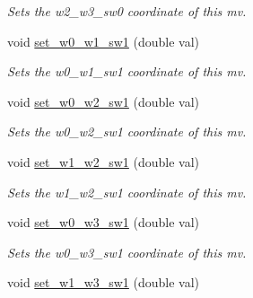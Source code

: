 \begin{DoxyCompactItemize}
\begin{DoxyCompactList}\small\item\em Sets the w2\-\_\-w3\-\_\-sw0 coordinate of this mv. \end{DoxyCompactList}\item 
\hypertarget{classe3ga_1_1mv_aa7ab6415eb4c4310f8498ad53a774565}{void \hyperlink{classe3ga_1_1mv_aa7ab6415eb4c4310f8498ad53a774565}{set\-\_\-w0\-\_\-w1\-\_\-sw1} (double val)}\label{classe3ga_1_1mv_aa7ab6415eb4c4310f8498ad53a774565}

\begin{DoxyCompactList}\small\item\em Sets the w0\-\_\-w1\-\_\-sw1 coordinate of this mv. \end{DoxyCompactList}\item 
\hypertarget{classe3ga_1_1mv_a5e80118c8595b7cce491218e24780dc8}{void \hyperlink{classe3ga_1_1mv_a5e80118c8595b7cce491218e24780dc8}{set\-\_\-w0\-\_\-w2\-\_\-sw1} (double val)}\label{classe3ga_1_1mv_a5e80118c8595b7cce491218e24780dc8}

\begin{DoxyCompactList}\small\item\em Sets the w0\-\_\-w2\-\_\-sw1 coordinate of this mv. \end{DoxyCompactList}\item 
\hypertarget{classe3ga_1_1mv_a1af23c1fde3aa554ff5ff41246889f3e}{void \hyperlink{classe3ga_1_1mv_a1af23c1fde3aa554ff5ff41246889f3e}{set\-\_\-w1\-\_\-w2\-\_\-sw1} (double val)}\label{classe3ga_1_1mv_a1af23c1fde3aa554ff5ff41246889f3e}

\begin{DoxyCompactList}\small\item\em Sets the w1\-\_\-w2\-\_\-sw1 coordinate of this mv. \end{DoxyCompactList}\item 
\hypertarget{classe3ga_1_1mv_aabaf3d1b0989642b7fe9edde66bac75d}{void \hyperlink{classe3ga_1_1mv_aabaf3d1b0989642b7fe9edde66bac75d}{set\-\_\-w0\-\_\-w3\-\_\-sw1} (double val)}\label{classe3ga_1_1mv_aabaf3d1b0989642b7fe9edde66bac75d}

\begin{DoxyCompactList}\small\item\em Sets the w0\-\_\-w3\-\_\-sw1 coordinate of this mv. \end{DoxyCompactList}\item 
\hypertarget{classe3ga_1_1mv_aa7ad673ed0e9d10fdb04f51480842169}{void \hyperlink{classe3ga_1_1mv_aa7ad673ed0e9d10fdb04f51480842169}{set\-\_\-w1\-\_\-w3\-\_\-sw1} (double val)}\label{classe3ga_1_1mv_aa7ad673ed0e9d10fdb04f51480842169}


\end{DoxyCompactItemize}
